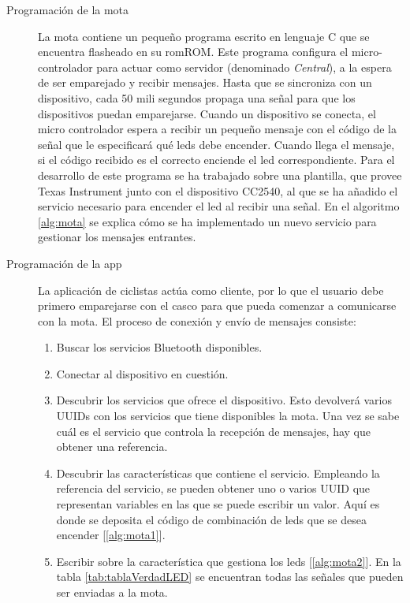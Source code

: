 \begin{description}
	\item[Programación de la mota] La mota contiene un pequeño programa escrito en
	lenguaje C que se	encuentra flasheado en su \gls{rom}ROM. Este programa configura
	el micro-controlador para actuar como servidor (denominado \emph{Central}), a
	la espera de ser emparejado y recibir mensajes. Hasta que se sincroniza con un
	dispositivo, cada 50 mili segundos propaga una señal para que los dispositivos
	puedan emparejarse. Cuando un dispositivo se conecta, el micro controlador espera
	a recibir un pequeño mensaje con el código de la señal que le especificará qué
	leds debe encender. Cuando llega el mensaje, si el código recibido es el correcto
	enciende el led correspondiente. Para el desarrollo de este programa se ha trabajado
	sobre una plantilla, que provee Texas Instrument junto con el dispositivo CC2540,
	al que se ha añadido el servicio necesario para encender el led al recibir una
	señal. En el algoritmo \ref{alg:mota} se explica cómo se ha implementado un nuevo
	servicio para gestionar los mensajes entrantes.

	\item[Programación de la app] La aplicación de ciclistas actúa como cliente, por
	lo que el usuario debe primero emparejarse con el casco para que pueda comenzar
	a comunicarse con la mota. El proceso de conexión y envío	de mensajes consiste:
		\begin{enumerate}
			\item Buscar los servicios Bluetooth disponibles.

			\item Conectar al dispositivo en cuestión.

			\item Descubrir los servicios que ofrece el dispositivo. Esto devolverá varios
			UUIDs con los servicios que tiene disponibles la mota. Una vez se sabe cuál
			es el servicio que controla la recepción de mensajes, hay que obtener	una
			referencia.

			\item Descubrir las características que contiene el servicio. Empleando la
			referencia del servicio, se pueden obtener uno o varios UUID que representan
			variables en las que se puede escribir un valor. Aquí es donde se deposita
			el código de combinación de leds que se desea encender [\ref{alg:mota1}].

			\item Escribir sobre la característica que gestiona los leds [\ref{alg:mota2}]. En la tabla
			\ref{tab:tablaVerdadLED} se encuentran todas las señales que pueden ser enviadas
			a la mota.
		\end{enumerate}


\end{description}
